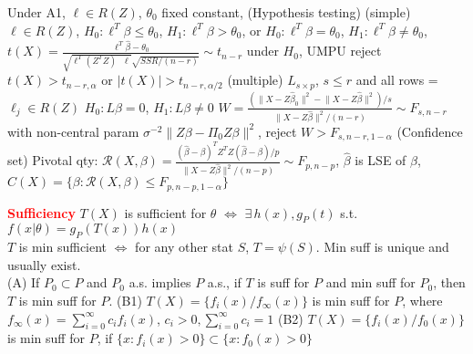 \documentclass{article}
\renewcommand{\section}[1]{\textcolor{red}{\textbf{#1}}}
\renewcommand{\subsection}[1]{\text{\hl{[#1]}}}
\newcommand{\compact}{\\}
\begin{document}
\subsection{Testing}
Under A1, $\ell \in R(Z)$, $\theta_0$ fixed constant,
(Hypothesis testing)
(simple)
$\ell \in R(Z)$,
$H_0: \ell^T\beta \leq \theta_0$, $H_1: \ell^T\beta > \theta_0$,
or $H_0: \ell^T\beta = \theta_0$, $H_1: \ell^T\beta \neq \theta_0$,
$
    t(X) = \frac{\ell^T\hat\beta - \theta_0}{
        \sqrt{ \ell^T(Z^TZ)^-\ell }
        \sqrt{ SSR/(n-r) }
    } \sim t_{n-r}
$ under $H_0$,
UMPU reject $t(X) > t_{n-r, \alpha}$
or $|t(X)| > t_{n-r, \alpha/2}$
(multiple)
$L_{s\times p}$, $s \leq r$ and all rows = $\ell_j \in R(Z)$
$H_0: L\beta = 0$, $H_1: L\beta \neq 0$
$
    W = \frac{(\lVert X - Z\hat\beta_0 \rVert^2 - \lVert X - Z\hat\beta
        \rVert^2)/s}{\lVert X - Z\hat\beta \rVert^2/(n-r)} \sim F_{s, n-r}
        {}
$
with non-central param
$\sigma^{-2}\lVert Z\beta - \Pi_0Z\beta\rVert^2$,
reject $W > F_{s, n-r, 1-\alpha}$
(Confidence set)
Pivotal qty: $
    \mathcal{R}(X, \beta) = \frac{(\hat\beta -
        \beta)^TZ^TZ(\hat\beta-\beta)/p}{
        \lVert X - Z\hat\beta \rVert^2/(n-p)
    } \sim F_{p, n-p}
$, $\hat\beta$ is LSE of $\beta$,
$C(X) = \{\beta: \mathcal{R}(X, \beta) \leq F_{p, n-p, 1-\alpha}\}$

\section{Sufficiency}
\subsection{Factorization}
$T(X)$ is sufficient for $\theta$ $\Leftrightarrow$ $\exists \, h(x), g_P(t)$
s.t. $f(x|\theta) = g_P(T(x)) h(x)$
\compact
\subsection{Min. Sufficient}
$T$ is min sufficient $\Leftrightarrow$ for any other stat $S$,
$T=\psi(S)$.
Min suff is unique and usually exist.
\compact
\subsection{Method 1}
(A) If $P_0 \subset P$ and $P_0$ a.s. implies $P$ a.s.,
if $T$ is suff for $P$ and min suff for $P_0$, then $T$ is min suff for $P$.
(B1) $T(X) = \{f_i(x)/f_\infty(x)\}$ is min suff for $P$,
where $f_\infty(x) = \sum_{i=0}^\infty c_i f_i(x)$, $c_i > 0,
    \sum_{i=0}^\infty c_i = 1$
(B2) $T(X) = \{f_i(x) / f_0(x)\}$ is min suff for $P$,
if $\{x: f_i(x) > 0 \} \subset \{ x: f_0(x) > 0 \}$
\compact
\end{document}
